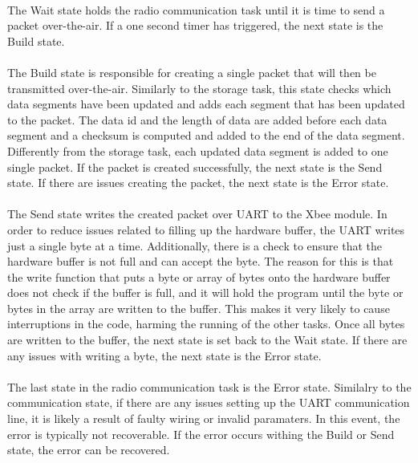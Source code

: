 \paragraph{}
The Wait state holds the radio communication task until it is time to send a packet over-the-air.
If a one second timer has triggered, the next state is the Build state.

\paragraph{}
The Build state is responsible for creating a single packet that will then be transmitted over-the-air.
Similarly to the storage task, this state checks which data segments have been updated and adds each segment that has been updated to the packet.
The data id and the length of data are added before each data segment and a checksum is computed and added to the end of the data segment.
Differently from the storage task, each updated data segment is added to one single packet.
If the packet is created successfully, the next state is the Send state.
If there are issues creating the packet, the next state is the Error state.

\paragraph{}
The Send state writes the created packet over UART to the Xbee module.
In order to reduce issues related to filling up the hardware buffer, the UART writes just a single byte at a time.
Additionally, there is a check to ensure that the hardware buffer is not full and can accept the byte.
The reason for this is that the write function that puts a byte or array of bytes onto the hardware buffer does not check if the buffer is full, and it will hold the program until the byte or bytes in the array are written to the buffer.
This makes it very likely to cause interruptions in the code, harming the running of the other tasks.
Once all bytes are written to the buffer, the next state is set back to the Wait state.
If there are any issues with writing a byte, the next state is the Error state.

\paragraph{}
The last state in the radio communication task is the Error state.
Similalry to the communication state, if there are any issues setting up the UART communication line, it is likely a result of faulty wiring or invalid paramaters.
In this event, the error is typically not recoverable.
If the error occurs withing the Build or Send state, the error can be recovered.


